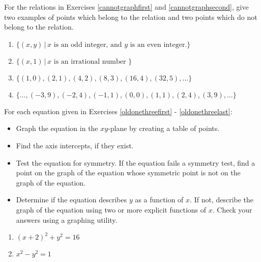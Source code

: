 \documentclass{ximera}
\begin{document}
\smallskip

For the relations in Exercises \ref{cannotgraphfirst} and \ref{cannotgraphsecond}, give two examples of points which belong to the relation and two points which do not belong to the relation.


\begin{enumerate}
\setcounter{enumi}{\value{HW}}


\item $\{(x, y) \, | \, x \mbox{ is an odd integer, and } y \mbox{ is an even integer.}\}$ \label{cannotgraphfirst}
\item $\{(x, 1) \, | \, x \mbox{ is an irrational number }\}$ \label{cannotgraphsecond}
\item $\{(1, 0), (2, 1), (4, 2), (8, 3), (16, 4), (32, 5), \ldots \}$
\item $\{\ldots, (-3, 9), (-2, 4), (-1, 1), (0, 0), (1, 1), (2, 4), (3, 9), \ldots \}$ \label{cannotgraphlast}

\setcounter{HW}{\value{enumi}}
\end{enumerate}


For each equation given in Exercises \ref{oldonethreefirst} - \ref{oldonethreelast}:

\begin{itemize}

\item   Graph the equation in the $xy$-plane by creating a table of points. 

\item  Find the axis intercepts, if they exist.

\item  Test the equation for symmetry.  If the equation fails a symmetry test, find a point on the graph of the equation whose symmetric point is not on the graph of the equation.

\item  Determine if the equation describes $y$ as a function of $x$.  If not, describe the graph of the equation using two or more explicit functions of $x$.  Check your answers using a graphing utility.


\end{itemize}


\begin{multicols}{2}
\begin{enumerate}
\setcounter{enumi}{\value{HW}}

\item  $(x+2)^2+y^2 = 16$  \label{oldonethreefirst}

\item $x^{2} - y^{2} = 1$

\setcounter{HW}{\value{enumi}}
\end{enumerate}
\end{multicols}
\end{document}
